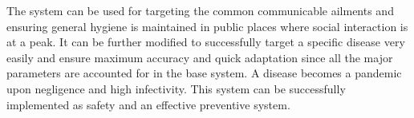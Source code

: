 \documentclass[12pt]{article}
\begin{document}
\vspace{\baselineskip}
\setlength{\parskip}{9.96pt}
\setlength{\parskip}{0.0pt}
\begin{justify}
The system can be used for targeting the common communicable ailments and ensuring general hygiene is maintained in public places where social interaction is at a peak. It can be further modified to successfully target a specific disease very easily and ensure maximum accuracy and quick adaptation since all the major parameters are accounted for in the base system. A disease becomes a pandemic upon negligence and high infectivity. This system can be successfully implemented as safety and an effective preventive system.
\end{justify}

\vspace{\baselineskip}
\setlength{\parskip}{9.96pt}

\vspace{\baselineskip}
\setlength{\parskip}{0.0pt}
\setlength{\parskip}{9.96pt}

\vspace{\baselineskip}
\setlength{\parskip}{0.0pt}
\setlength{\parskip}{9.96pt}
\vspace{\baselineskip}
\vspace{\baselineskip}
\vspace{\baselineskip}
\vspace{\baselineskip}
\vspace{\baselineskip}
\vspace{\baselineskip}
\vspace{\baselineskip}
\vspace{\baselineskip}
\vspace{\baselineskip}
\vspace{\baselineskip}
\vspace{\baselineskip}
\vspace{\baselineskip}
\vspace{\baselineskip}
\end{document}
